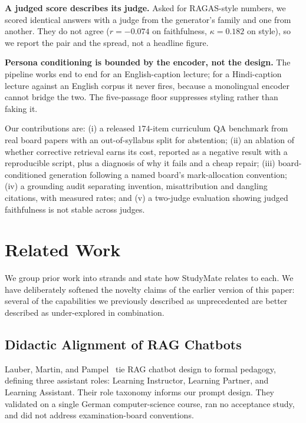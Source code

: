 \documentclass[conference]{IEEEtran}
\begin{document}
\textbf{A judged score describes its judge.} Asked for RAGAS-style numbers, we
scored identical answers with a judge from the generator's family and one from
another. They do not agree ($r = -0.074$ on faithfulness, $\kappa = 0.182$ on
style), so we report the pair and the spread, not a headline figure.

\textbf{Persona conditioning is bounded by the encoder, not the design.} The
pipeline works end to end for an English-caption lecture; for a Hindi-caption
lecture against an English corpus it never fires, because a monolingual encoder
cannot bridge the two. The five-passage floor suppresses styling rather than
faking it.

Our contributions are: (i) a released $174$-item curriculum QA benchmark from
real board papers with an out-of-syllabus split for abstention; (ii) an
ablation of whether corrective retrieval earns its cost, reported as a negative
result with a reproducible script, plus a diagnosis of why it fails and a cheap
repair; (iii) board-conditioned generation following a named board's
mark-allocation convention; (iv) a grounding audit separating invention,
misattribution and dangling citations, with measured rates; and (v) a
two-judge evaluation showing judged faithfulness is not stable across
judges.

\section{Related Work}
We group prior work into strands and state how StudyMate relates to each. We
have deliberately softened the novelty claims of the earlier version of this
paper: several of the capabilities we previously described as unprecedented are
better described as under-explored in combination.

\subsection{Didactic Alignment of RAG Chatbots}
Lauber, Martin, and Pampel~\cite{lauber2025} tie RAG chatbot design to formal
pedagogy, defining three assistant roles: Learning Instructor, Learning Partner,
and Learning Assistant. Their role taxonomy informs our prompt design. They
validated on a single German computer-science course, ran no acceptance study,
and did not address examination-board conventions.
\end{document}

